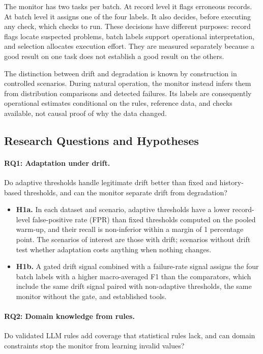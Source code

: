 The monitor has two tasks per batch. At record level it flags erroneous records. At batch level it assigns one of the four labels. It also decides, before executing any check, which checks to run. These decisions have different purposes: record flags locate suspected problems, batch labels support operational interpretation, and selection allocates execution effort. They are measured separately because a good result on one task does not establish a good result on the others.

The distinction between drift and degradation is known by construction in controlled scenarios. During natural operation, the monitor instead infers them from distribution comparisons and detected failures. Its labels are consequently operational estimates conditional on the rules, reference data, and checks available, not causal proof of why the data changed.

\subsection{Research Questions and Hypotheses}

\paragraph{RQ1: Adaptation under drift.} Do adaptive thresholds handle legitimate drift better than fixed and history-based thresholds, and can the monitor separate drift from degradation?

\begin{itemize}
\item \textbf{H1a.} In each dataset and scenario, adaptive thresholds have a lower record-level false-positive rate (FPR) than fixed thresholds computed on the pooled warm-up, and their recall is non-inferior within a margin of 1 percentage point. The scenarios of interest are those with drift; scenarios without drift test whether adaptation costs anything when nothing changes.
\item \textbf{H1b.} A gated drift signal combined with a failure-rate signal assigns the four batch labels with a higher macro-averaged F1 than the comparators, which include the same drift signal paired with non-adaptive thresholds, the same monitor without the gate, and established tools.
\end{itemize}

\paragraph{RQ2: Domain knowledge from rules.} Do validated LLM rules add coverage that statistical rules lack, and can domain constraints stop the monitor from learning invalid values?

